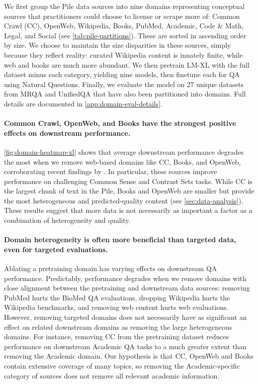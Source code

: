 \documentclass{article}
\newcommand{\bigLM}[0]{\textsc{LM-XL}}
\begin{document}
We first group the Pile data sources into nine domains representing conceptual sources that practitioners could choose to license or scrape more of: Common Crawl (CC), OpenWeb, Wikipedia, Books, PubMed, Academic, Code \& Math, Legal, and Social (see \cref{tab:pile-partitions}).
These are sorted in ascending order by size.
We choose to maintain the size disparities in these sources, simply because they reflect reality: curated Wikipedia content is innately finite, while web and books are much more abundant.
We then pretrain \bigLM{} with the full dataset minus each category, yielding nine models, then finetune each for QA using Natural Questions. 
Finally, we evaluate the model on 27 unique datasets from MRQA \citep{fisch2019mrqa} and UnifiedQA \citep{khashabi-etal-2020-unifiedqa} that have also been partitioned into domains. 
Full details are documented in \cref{app:domain-eval-details}.

\vspace{-3mm}
\paragraph{Common Crawl, OpenWeb, and Books have the strongest positive effects on downstream performance.}
\cref{fig:domain-heatmap-xl} shows that average downstream performance degrades the most when we remove web-based domains like CC, Books, and OpenWeb, corroborating recent findings by \citet{xie2023doremi}.
In particular, these sources improve performance on challenging Common Sense and Contrast Sets tasks.
While CC is the largest chunk of text in the Pile, Books and OpenWeb are smaller but provide the most heterogeneous and predicted-quality content (see \cref{sec:data-analysis}).
These results suggest that more data is not necessarily as important a factor as a combination of heterogeneity and quality.

\vspace{-3mm}
\paragraph{Domain heterogeneity is often more beneficial than targeted data, even for targeted evaluations.}
Ablating a pretraining domain has varying effects on downstream QA performance.
Predictably, performance degrades when we remove domains with close alignment between the pretraining and downstream data sources: removing PubMed hurts the BioMed QA evaluations, dropping Wikipedia hurts the Wikipedia benchmarks, and removing web content hurts web evaluations.
However, removing targeted domains does not necessarily have as significant an effect on related downstream domains as removing the large heterogeneous domains.
For instance, removing CC from the pretraining dataset reduces performance on downstream Academic QA tasks to a much greater extent than removing the Academic domain.
Our hypothesis is that CC, OpenWeb and Books contain extensive coverage of many topics, so removing the Academic-specific category of sources does not remove all relevant academic information.
\end{document}
